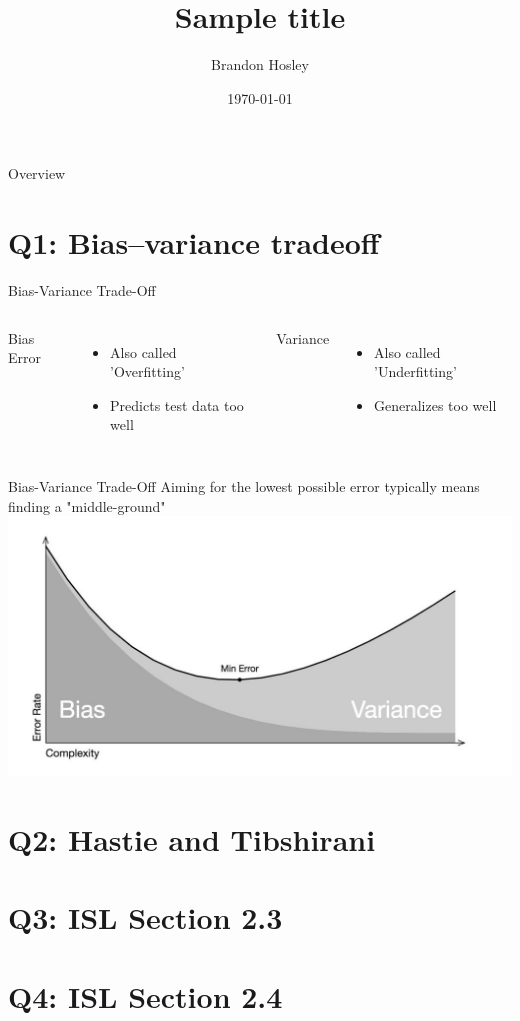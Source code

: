 \documentclass{beamer}
\title{Sample title}
\author{Brandon Hosley}
\institute{University of Illinois - Springfield}
\date{\today}
\begin{document}
\frame{\titlepage}

\begin{frame}{Overview}
\tableofcontents
\end{frame}

\section[Q1]{Q1: Bias–variance tradeoff}

\begin{frame}{Bias-Variance Trade-Off}
	\begin{columns}
		Bias Error
		\begin{itemize}
			\item<1-> Also called 'Overfitting'
			\item<3-> Predicts test data too well
		\end{itemize}
		
		Variance 
		\begin{itemize}
			\item<2-> Also called 'Underfitting'
			\item<4-> Generalizes too well
		\end{itemize}
	\end{columns}
\end{frame}

\begin{frame}{Bias-Variance Trade-Off}
	Aiming for the lowest possible error typically means finding a "middle-ground" \\
	\includegraphics[width=0.5\linewidth]{MinError}
\end{frame}

\section[Q2]{Q2: Hastie and Tibshirani}
\section[Q3]{Q3: ISL Section 2.3}
\section[Q4]{Q4: ISL Section 2.4}
\end{document}
